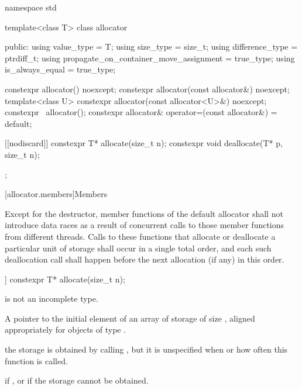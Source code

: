 %
%
%
%
%
%
%
\begin{codeblock}
namespace std {
  template<class T> class allocator {
   public:
    using value_type                             = T;
    using size_type                              = size_t;
    using difference_type                        = ptrdiff_t;
    using propagate_on_container_move_assignment = true_type;
    using is_always_equal                        = true_type;

    constexpr allocator() noexcept;
    constexpr allocator(const allocator&) noexcept;
    template<class U> constexpr allocator(const allocator<U>&) noexcept;
    constexpr ~allocator();
    constexpr allocator& operator=(const allocator&) = default;

    [[nodiscard]] constexpr T* allocate(size_t n);
    constexpr void deallocate(T* p, size_t n);
  };
}
\end{codeblock}

[allocator.members]{Members}

\pnum
Except for the destructor, member functions of the default allocator shall not introduce
data races as a result of concurrent calls to those member
functions from different threads. Calls to these functions that allocate or deallocate a
particular unit of storage shall occur in a single total order, and each such
deallocation call shall happen before the next allocation (if any) in this order.

%
\begin{itemdecl}
[[nodiscard]] constexpr T* allocate(size_t n);
\end{itemdecl}

\begin{itemdescr}
\pnum
\mandates
{} is not an incomplete type.

\pnum
\returns
A pointer to the initial element of an array of storage of size 
, aligned appropriately for objects of type .

\pnum
\remarks
the storage is obtained by calling ,
but it is unspecified when or how often this
function is called.

\pnum
\throws
{} if , or
 if the storage cannot be obtained.
\end{itemdescr}

